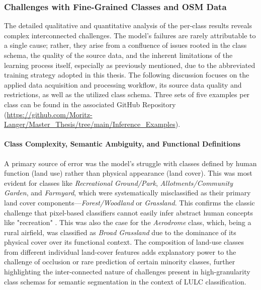 \documentclass{report}
\begin{document}
\subsubsection{Challenges with Fine-Grained Classes and OSM Data}
\label{sec:discussion_challenges_data}
The detailed qualitative and quantitative analysis of the per-class results reveals complex interconnected challenges. The model's failures are rarely attributable to a single cause; rather, they arise from a confluence of issues rooted in the class schema, the quality of the source data, and the inherent limitations of the learning process itself, especially as previously mentioned, due to the abbreviated training strategy adopted in this thesis. The following discussion focuses on the applied data acquisition and processing workflow, its source data quality and restrictions, as well as the utilized class schema. Three sets of five examples per class can be found in the associated GitHub Repository (\url{https://github.com/Moritz-Langer/Master_Thesis/tree/main/Inference_Examples}).
\paragraph{Class Complexity, Semantic Ambiguity, and Functional Definitions} A primary source of error was the model's struggle with classes defined by human function (land use) rather than physical appearance (land cover). This was most evident for classes like \textit{Recreational Ground/Park}, \textit{Allotments/Community Garden}, and \textit{Farmyard}, which were systematically misclassified as their primary land cover components—\textit{Forest/Woodland} or \textit{Grassland}. This confirms the classic challenge that pixel-based classifiers cannot easily infer abstract human concepts like "recreation" \parencite[p.~313]{KotaridisLazaridouRemotesensingimagesegmentationadvancesmetaanalysis2021a}. This was also the case for the \textit{Aerodrome} class, which, being a rural airfield, was classified as \textit{Broad Grassland} due to the dominance of its physical cover over its functional context. The composition of land-use classes from different individual land-cover features adds explanatory power to the challenge of occlusion or rare prediction of certain minority classes, further highlighting the inter-connected nature of challenges present in high-granularity class schemas for semantic segmentation in the context of LULC classification.
\end{document}
